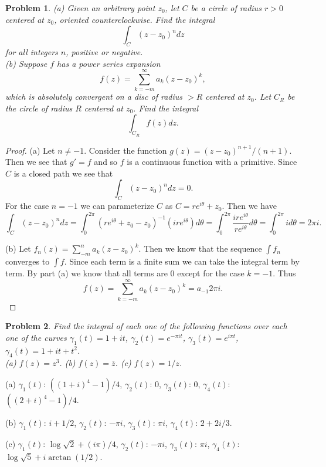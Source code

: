 \documentclass{article}
\newtheorem{problem}{Problem}
\begin{document}
\begin{problem}
(a) Given an arbitrary point $z_0$, let $C$ be a circle of radius $r > 0$ centered at $z_0$, oriented counterclockwise. Find the integral
\[
\int_C (z-z_0)^n dz
\]
for all integers $n$, positive or negative.\\
(b) Suppose $f$ has a power series expansion
\[
f(z) = \sum_{k = -m}^{\infty} a_k (z - z_0)^k,
\]
which is absolutely convergent on a disc of radius $> R$ centered at $z_0$. Let $C_R$ be the circle of radius $R$ centered at $z_0$. Find the integral
\[
\int_{C_R} f(z) dz.
\]
\end{problem}
\begin{proof}
(a) Let $n \neq -1$. Consider the function $g(z) = (z-z_0)^{n+1}/(n+1)$. Then we see that $g' = f$ and so $f$ is a continuous function with a primitive. Since $C$ is a closed path we see that
\[
\int_C (z-z_0)^n dz = 0.
\]
For the case $n = -1$ we can parameterize $C$ as $C = re^{i \theta} + z_0$. Then we have
\[
\int_C (z-z_0)^n dz = \int_0^{2 \pi} (re^{i \theta} + z_0 - z_0)^{-1}(ire^{i \theta}) d\theta = \int_0^{2 \pi} \frac{ire^{i \theta}}{re^{i \theta}} d \theta = \int_0^{2 \pi} i d\theta = 2 \pi i.
\]

(b) Let $f_n (z) = \sum_{-m}^{n} a_k(z - z_0)^k$. Then we know that the sequence $\int f_n$ converges to $\int f$. Since each term is a finite sum we can take the integral term by term. By part (a) we know that all terms are $0$ except for the case $k = -1$. Thus
\[
f(z) = \sum_{k = -m}^{\infty} a_k (z - z_0)^k = a_{-1}2 \pi i.
\]
\end{proof}

\begin{problem}
Find the integral of each one of the following functions over each one of the curves $\gamma_1 (t) = 1 + it$, $\gamma_2(t) = e^{-\pi i t}$, $\gamma_3(t) = e^{i \pi t}$, $\gamma_4(t) = 1 + it + t^2$.\\
(a) $f(z) = z^3$.
(b) $f(z) = \overline{z}$.
(c) $f(z) = 1/z$.
\end{problem}

(a) $\gamma_1(t)$: $((1+i)^4-1)/4$, $\gamma_2(t)$: $0$, $\gamma_3(t)$: $0$, $\gamma_4(t)$: $((2+i)^4-1)/4$.

(b) $\gamma_1(t)$: $i + 1/2$, $\gamma_2(t)$: $- \pi i$, $\gamma_3(t)$: $\pi i$, $\gamma_4(t)$: $2+2i/3$.

(c) $\gamma_1(t)$: $\log \sqrt{2} + (i \pi)/4$, $\gamma_2(t)$: $- \pi i$, $\gamma_3(t)$: $\pi i$, $\gamma_4(t)$: $\log \sqrt{5} + i \arctan(1/2)$.
\end{document}
